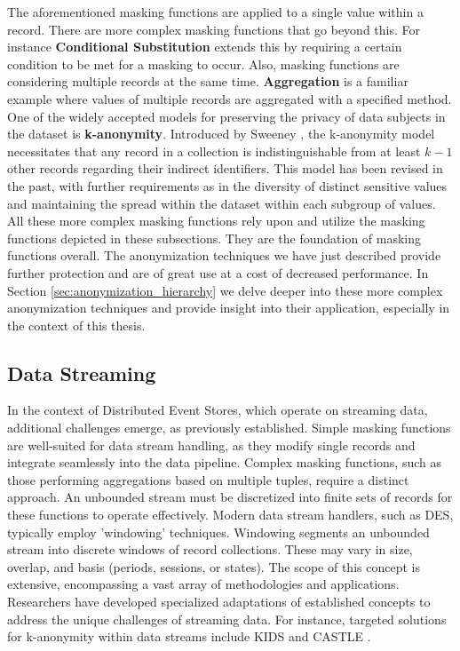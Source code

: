 The aforementioned masking functions are applied to a single value within a record. There are more complex masking functions that go beyond this. For instance \textbf{Conditional Substitution} extends this by requiring a certain condition to be met for a masking to occur. Also, masking functions are considering multiple records at the same time. \textbf{Aggregation} is a familiar example where values of multiple records are aggregated with a specified method. One of the widely accepted models for preserving the privacy of data subjects in the dataset is \textbf{k-anonymity}. Introduced by Sweeney \cite{sweeney2002kanonymity}, the k-anonymity model necessitates that any record in a collection is indistinguishable from at least $k-1$ other records regarding their indirect identifiers. This model has been revised in the past, with further requirements as in the diversity of distinct sensitive values and maintaining the spread within the dataset within each subgroup of values. All these more complex masking functions rely upon and utilize the masking functions depicted in these subsections. They are the foundation of masking functions overall. The anonymization techniques we have just described provide further protection and are of great use at a cost of decreased performance. In Section \ref{sec:anonymization_hierarchy} we delve deeper into these more complex anonymization techniques and provide insight into their application, especially in the context of this thesis. 

\subsection{Data Streaming\label{lit:data_streaming}}
In the context of Distributed Event Stores, which operate on streaming data, additional challenges emerge, as previously established. Simple masking functions are well-suited for data stream handling, as they modify single records and integrate seamlessly into the data pipeline. Complex masking functions, such as those performing aggregations based on multiple tuples, require a distinct approach. An unbounded stream must be discretized into finite sets of records for these functions to operate effectively. Modern data stream handlers, such as \ac{DES}, typically employ 'windowing' techniques. Windowing segments an unbounded stream into discrete windows of record collections. These may vary in size, overlap, and basis (periods, sessions, or states). The scope of this concept is extensive, encompassing a vast array of methodologies and applications. Researchers have developed specialized adaptations of established concepts to address the unique challenges of streaming data. For instance, targeted solutions for k-anonymity within data streams include KIDS \cite{KIDS_zhang} and CASTLE \cite{Cao2008}. 




